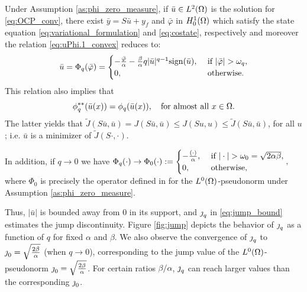 \begin{remark}\label{r:u_prop} 
	Under Assumption 	\ref{as:phi_zero_measure}, if $\bar u \in L^2(\Omega)$ is the solution for 
	\eqref{eq:OCP_conv}, there exist $\bar y =S\bar u +y_f$ and $\bar\varphi$ in $H_0^1(\Omega)$ which satisfy
	 the state equation \eqref{eq:variational_formulation} and \eqref{eq:costate}, respectively and moreover 
	 the relation \eqref{eq:uPhi.1_convex} reduces to: 
\begin{equation}\label{eq:Phi2_convex}
			\bar u=\Phi_q (\bar\varphi) =	
			\begin{cases}
				-\frac{\bar\varphi}{\alpha}-\frac{\beta}{\alpha} q |\bar u|^{q-1}\sign (\bar u), & \text{ if } |\bar\varphi|> \omega_q, \\
				0,                         &	\text{ otherwise.}
			\end{cases}
		\end{equation}
This relation also implies that
\begin{equation}\label{eq:phi_q_eval_u}
\phi_q^{**}(\bar u(x)) = \phi_q(\bar u(x)), \quad \text{for almost all } x \in \Omega.
\end{equation}
The latter yields that $\tilde J(S\bar u,\bar u) = J(S\bar u,\bar u) \leq J(S  u,  u) \leq \tilde J(S\bar u,\bar u)$, for all $u$; i.e. $\bar u$ is a minimizer of $\tilde J(S\cdot,\cdot)$. 

In addition, if $q \to 0$ we have
	$
		\Phi_q (\cdot)  \arrow 	\Phi_0(\cdot):=
		\begin{cases}
			-\frac{(\cdot)}{\alpha}, & \text{ if } |\cdot|> \omega_0=\sqrt{2\alpha\beta}, \\
			0,                         &	\text{ otherwise,}
		\end{cases},
	$
	where $\Phi_0$ is precisely the operator defined in \cite{ito-kunisch2014} for the $L^0(\Omega)$-pseudonorm under Assumption \ref{as:phi_zero_measure}.          
\end{remark}
Thus, $|\bar u|$ is bounded away from 0 in its support, and $\operatorname{\jmath}_q$ in 
\eqref{eq:jump_bound} estimates the jump discontinuity. Figure 
\ref{fig:jump} depicts the behavior of $\operatorname{\jmath}_q$ as a function of $q$ for fixed $\alpha$ and $\beta$. We also observe the convergence of $\operatorname{\jmath}_q$ to $\operatorname{\jmath}_0=\sqrt{\frac{2\beta}{\alpha}}$ (when $q\to 0$), corresponding to the jump value of the $L^0(\Omega)$-pseudonorm $\operatorname{\jmath}_0=\sqrt{\frac{2\beta}{\alpha}}$. For certain ratios $\beta/\alpha$,  $\operatorname{\jmath}_q$ can reach larger values than the corresponding $\operatorname{\jmath}_0$.

